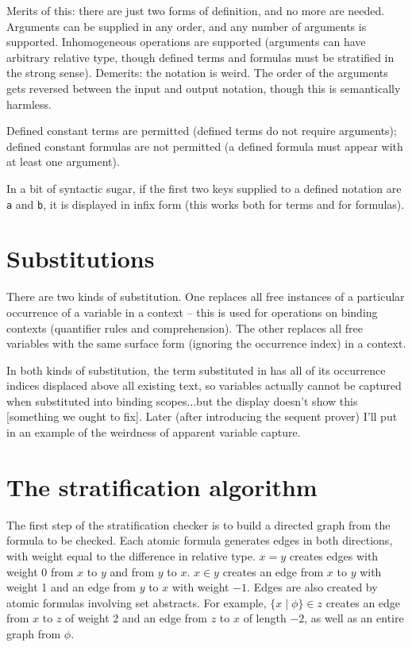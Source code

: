 \documentclass[12pt]{article}
\begin{document}
Merits of this:  there are just two forms of definition, and no more are needed.  Arguments can be supplied in any order, and any number of arguments is supported.  Inhomogeneous operations
are supported (arguments can have arbitrary relative type, though defined terms and formulas must be stratified in the strong sense).   Demerits:  the notation is weird.  The order of the arguments gets reversed between the input and output notation, though this is semantically harmless.

Defined constant terms are permitted (defined terms do not require arguments);  defined constant formulas are not permitted (a defined formula must appear with at least one argument).

In a bit of syntactic sugar, if the first two keys supplied to a defined notation are {\tt a} and {\tt b}, it is displayed in infix form (this works both for terms and for formulas).

\section{Substitutions}

There are two kinds of substitution. One replaces all free
instances of a particular occurrence of a variable in a context
-- this is used for operations on binding contexts (quantifier
rules and comprehension). The other replaces all free variables
with the same surface form (ignoring the occurrence index) in a
context.

In both kinds of substitution, the term substituted in has all
of its occurrence indices displaced above all existing text, so
variables actually cannot be captured when substituted into
binding scopes...but the display
doesn't show this [something we ought to fix]. Later (after
introducing the sequent prover) I'll put in an example of the
weirdness of apparent variable capture.

\section{The stratification algorithm}

The first step of the stratification checker is to build a
directed graph from the formula to be checked. Each atomic
formula generates edges in both directions, with weight equal to
the difference in relative type.
$x=y$ creates edges with weight 0 from $x$ to $y$ and from $y$
to $x$. $x \in y$ creates an edge from $x$ to $y$ with weight 1
and an edge from $y$ to $x$ with weight $-1$. Edges are also
created by
atomic formulas involving set abstracts. For example, $\{x \mid
\phi\} \in z$ creates an edge from $x$ to $z$ of weight 2 and an
edge from $z$ to $x$ of length $-2$, as well as an entire graph
from $\phi$.
\end{document}
